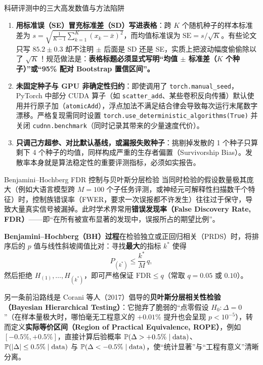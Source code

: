 \begin{failBox}{科研评测中的三大高发数值与方法陷阱}
\begin{enumerate}
  \item \textbf{用标准误（SE）冒充标准差（SD）写进表格}：跨 $K$ 个随机种子的样本标准差为 $s = \sqrt{\frac{1}{K-1}\sum_{k=1}^K (x_k - \bar{x})^2}$，而均值标准误为 $\mathrm{SE} = s / \sqrt{K}$。有些论文只写 $85.2 \pm 0.3$ 却不注明 $\pm$ 后面是 SD 还是 SE，实质上把波动幅度偷偷除以了 $\sqrt{K}$！规范做法是：\textbf{表格标题必须显式写明“均值 $\pm$ 标准差（$K$ 个种子）”或“95\% 配对 Bootstrap 置信区间”。}
  \item \textbf{未固定种子与 GPU 非确定性归约}：即使调用了 \texttt{torch.manual\_seed}，PyTorch 中部分 CUDA 算子（如 \texttt{scatter\_add}、某些卷积反向传播）默认使用并行原子加（\texttt{atomicAdd}），浮点加法不满足结合律会导致每次运行末尾数字漂移。严格复现需同时设置 \texttt{torch.use\_deterministic\_algorithms(True)} 并关闭 \texttt{cudnn.benchmark}（同时记录其带来的少量速度代价）。
  \item \textbf{只调己方超参、对比默认基线，或漏报失败种子}：挑剔掉发散的 1 个种子只算剩下 4 个种子的均值，同样构成严重的生存者偏置（Survivorship Bias）。发散率本身就是算法稳定性的重要评测指标，必须如实报告。
\end{enumerate}
\end{failBox}

\begin{extBox}{Benjamini--Hochberg FDR 控制与贝叶斯分层检验}
当同时检验的假设数量极其庞大（例如大语言模型跨 $M=100$ 个子任务评测，或神经元可解释性扫描数千个特征）时，控制族错误率（FWER，要求一次误报都不许发生）往往过于保守，导致大量真实信号被漏掉。此时学术界常用\textbf{错误发现率（False Discovery Rate, FDR）}——即“在所有被宣布显著的发现中，误报所占的期望比例”。

\textbf{Benjamini--Hochberg（BH）过程}在检验独立或正回归相关（PRDS）时，将排序后的 $p$ 值与线性斜坡阈值比对：寻找\textbf{最大}的指标 $k^*$ 使得
\[
  P_{(k^*)} \le \frac{k^*}{M}\, q,
\]
然后拒绝 $H_{(1)},\dots,H_{(k^*)}$，即可严格保证 $\mathrm{FDR} \le q$（常取 $q=0.05$ 或 $0.10$）。

另一条前沿路线是 Corani 等人（2017）倡导的\textbf{贝叶斯分层相关性检验（Bayesian Hierarchical Testing）}：它抛弃了脆弱的“点零假设 $H_0: \Delta = 0$”（在样本量极大时，哪怕毫无工程意义的 $+0.01\%$ 提升也会呈现 $p < 10^{-5}$），转而定义\textbf{实际等价区间（Region of Practical Equivalence, ROPE）}，例如 $[-0.5\%, +0.5\%]$，直接计算后验概率 $\mathbb{P}(\Delta > +0.5\% \mid \text{data})$、$\mathbb{P}(|\Delta| \le 0.5\% \mid \text{data})$ 与 $\mathbb{P}(\Delta < -0.5\% \mid \text{data})$，使“统计显著”与“工程有意义”清晰分离。
\end{extBox}

